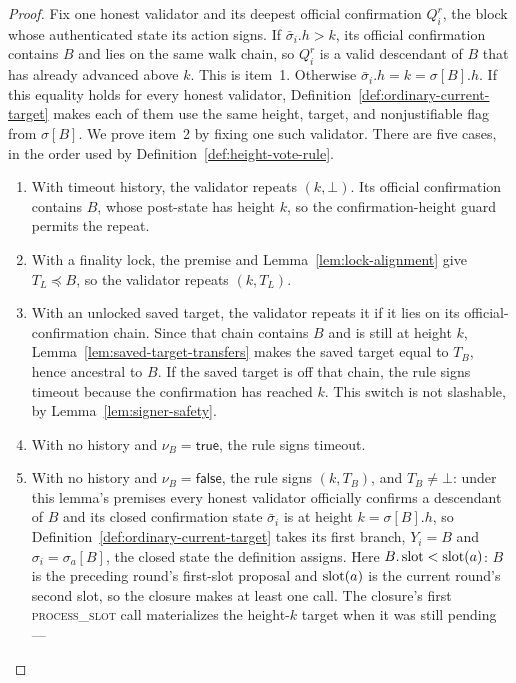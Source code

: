 \begin{proof}
Fix one honest validator and its deepest official confirmation
\(Q_i^r\), the block whose authenticated state its action signs.
If \(\bar\sigma_i.h>k\), its official confirmation contains \(B\) and lies on
the same walk chain, so \(Q_i^r\) is a valid descendant of \(B\) that has
already advanced above \(k\).  This is item~1.  Otherwise
\(\bar\sigma_i.h=k=\sigma[B].h\).  If this equality holds for every honest
validator, Definition~\ref{def:ordinary-current-target} makes each of them
use the same height, target, and nonjustifiable flag from \(\sigma[B]\).
We prove item~2 by fixing one such validator.  There are five cases, in the
order used by
Definition~\ref{def:height-vote-rule}.
\begin{enumerate}
 \item With timeout history, the validator repeats \((k,\bot)\).  Its official
   confirmation contains \(B\), whose post-state has height \(k\), so the
   confirmation-height guard permits the repeat.
 \item With a finality lock, the premise and
   Lemma~\ref{lem:lock-alignment} give \(T_L\preceq B\), so the validator
   repeats \((k,T_L)\).
 \item With an unlocked saved target, the validator repeats it if it lies on
   its official-confirmation chain.  Since that chain contains \(B\) and is
   still at height \(k\), Lemma~\ref{lem:saved-target-transfers} makes the
   saved target equal to \(T_B\), hence ancestral to \(B\).  If the saved
   target is off that chain, the rule signs timeout
   because the confirmation has reached \(k\).  This switch is not slashable,
   by Lemma~\ref{lem:signer-safety}.
 \item With no history and \(\nu_B=\mathsf{true}\), the rule signs timeout.
 \item With no history and \(\nu_B=\mathsf{false}\), the rule signs
   \((k,T_B)\), and \(T_B\neq\bot\): under this lemma's premises every
   honest validator officially confirms a descendant of \(B\) and its
   closed confirmation state \(\bar\sigma_i\) is at height
   \(k=\sigma[B].h\), so
   Definition~\ref{def:ordinary-current-target} takes its first branch,
   \(Y_i=B\) and \(\sigma_i=\sigma_a[B]\), the closed state the
   definition assigns.  Here \(B.\operatorname{\mathrm{slot}}<\operatorname{\mathrm{slot}}(a)\): \(B\) is the preceding round's
   first-slot proposal and \(\operatorname{\mathrm{slot}}(a)\) is the current round's second
   slot, so the closure makes at least one call.  The closure's first
   \textsc{process\_slot} call
   materializes the height-\(k\) target when it was still pending ---

\end{enumerate}
\end{proof}

